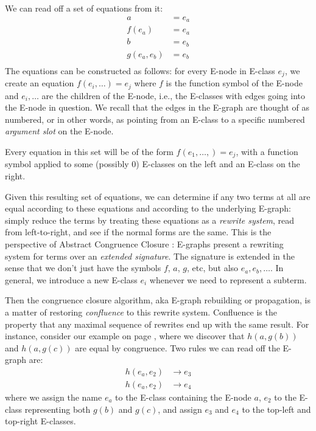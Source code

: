 \documentclass[12pt,a4paper,twoside,openright]{report}
\numberwithin{equation}{chapter}		%
\numberwithin{figure}{chapter}			%
\numberwithin{table}{chapter}			%
\theoremstyle{definition}
\theoremstyle{plain}
\begin{document}
We can read off a set of equations from it:
\begin{align*}
	a &= e_a \\
	f(e_a) &= e_a \\
	b &= e_b \\
	g(e_a, e_b) &= e_b \\
\end{align*}
The equations can be constructed as follows: for every E-node in E-class $e_j$, we create an equation $f(e_i, \ldots) = e_j$ where $f$ is the function symbol of the E-node and $e_i, \ldots$ are the children of the E-node, i.e., the E-classes with edges going into the E-node in question.
We recall that the edges in the E-graph are thought of as numbered, or in other words, as pointing from an E-class to a specific numbered \emph{argument slot} on the E-node.

Every equation in this set will be of the form $f(e_1, \ldots, ) = e_j$, with a function symbol applied to some (possibly 0) E-classes on the left and an E-class on the right.

Given this resulting set of equations, we can determine if any two terms at all are equal according to these equations and according to the underlying E-graph: simply reduce the terms by treating these equations as a \emph{rewrite system}, read from left-to-right, and see if the normal forms are the same. This is the perspective of Abstract Congruence Closure \citep{bachmair_abstract_2000}: E-graphs present a rewriting system for terms over an \emph{extended signature}. The signature is extended in the sense that we don't just have the symbols $f$, $a$, $g$, etc, but also $e_a, e_b, \ldots$. In general, we introduce a new E-class $e_i$ whenever we need to represent a subterm. 

Then the congruence closure algorithm, aka E-graph rebuilding or propagation, is a matter of restoring \emph{confluence} to this rewrite system. Confluence is the property that any maximal sequence of rewrites end up with the same result. For instance, consider our example on page \pageref{exampleBasic5}, where we discover that $h(a, g(b))$ and $h(a, g(c))$ are equal by congruence. Two rules we can read off the E-graph are:
\begin{align*}
	h(e_a, e_2) &\rightarrow e_3 \\
	h(e_a, e_2) &\rightarrow e_4
\end{align*}
where we assign the name $e_a$ to the E-class containing the E-node $a$, $e_2$ to the E-class representing both $g(b)$ and $g(c)$, and assign $e_3$ and $e_4$ to the top-left and top-right E-classes.
\end{document}
